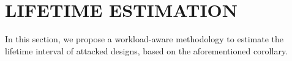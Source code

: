 
\section{LIFETIME ESTIMATION}
\label{sec:lt_estimation}
In this section, we propose a workload-aware methodology to estimate the lifetime interval of attacked designs, based on the aforementioned corollary.


